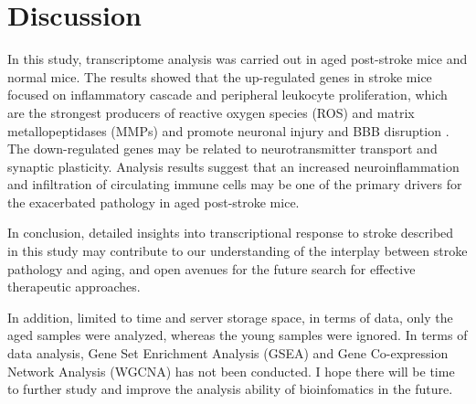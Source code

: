 \documentclass[
  a4paper,
]{article}
\begin{document}
\hypertarget{discussion}{%
\section{Discussion}\label{discussion}}

In this study, transcriptome analysis was carried out in aged
post-stroke mice and normal mice. The results showed that the
up-regulated genes in stroke mice focused on inflammatory cascade and
peripheral leukocyte proliferation, which are the strongest producers of
reactive oxygen species (ROS) and matrix metallopeptidases (MMPs) and
promote neuronal injury and BBB disruption
\cite{allenOxidativeStressIts2009,streckerNeutrophilGranulocytesCerebral2017}.
The down-regulated genes may be related to neurotransmitter transport
and synaptic plasticity. Analysis results suggest that an increased
neuroinflammation and infiltration of circulating immune cells may be
one of the primary drivers for the exacerbated pathology in aged
post-stroke mice.

In conclusion, detailed insights into transcriptional response to stroke
described in this study may contribute to our understanding of the
interplay between stroke pathology and aging, and open avenues for the
future search for effective therapeutic approaches.

In addition, limited to time and server storage space, in terms of data,
only the aged samples were analyzed, whereas the young samples were
ignored. In terms of data analysis, Gene Set Enrichment Analysis (GSEA)
and Gene Co-expression Network Analysis (WGCNA) has not been conducted.
I hope there will be time to further study and improve the analysis
ability of bioinfomatics in the future.


\printbibliography[title=References]
\end{document}
